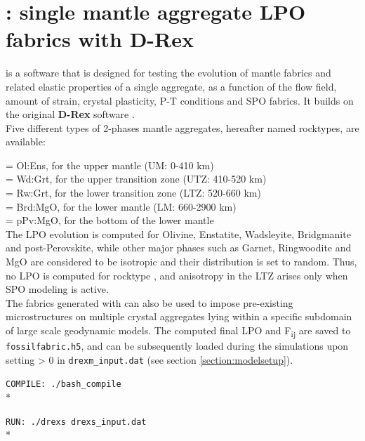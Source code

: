 \chapter{\drexstitle: single mantle aggregate LPO fabrics with D-Rex}
\label{chapter:drexs}

\drexstitle{} is a software that is designed for testing the evolution of mantle fabrics and related elastic properties of a single aggregate, as a function of the flow field, amount of strain, crystal plasticity, P-T conditions and SPO fabrics. It builds on the original \textbf{D-Rex} software \citep{kaminski2004gji}.\\
Five different types of 2-phases mantle aggregates, hereafter named rocktypes, are available:\\ 
\vspace{0.1cm}


 = Ol:Ens, for the upper mantle (UM: 0-410 km)\\ 
 = Wd:Grt, for the upper transition zone (UTZ: 410-520 km)\\ 
 = Rw:Grt, for the lower transition zone (LTZ: 520-660 km)\\ 
 = Brd:MgO, for the lower mantle (LM: 660-2900 km)\\ 
 = pPv:MgO, for the bottom of the lower mantle\\ 

The LPO evolution is computed for Olivine, Enstatite, Wadsleyite, Bridgmanite and post-Perovskite, while other major phases such as Garnet, Ringwoodite and MgO are considered to be isotropic and their distribution is set to random.
Thus, no LPO is computed for rocktype , and anisotropy in the LTZ arises only when SPO modeling is active.\\

The fabrics generated with \drexstitle{} can also be used to impose pre-existing microstructures on multiple crystal aggregates lying within a specific subdomain of large scale geodynamic models. The computed final LPO and F\textsubscript{ij} are saved to \texttt{fossilfabric.h5}, and can be subsequently loaded during the \drexmtitle{} simulations upon setting  > 0 in \texttt{drexm\_input.dat} (see section \ref{section:modelsetup}).
\vspace{0.5cm}

\texttt{COMPILE: ./bash\_compile}\\*

\texttt{RUN: ./drexs drexs\_input.dat}\\*


